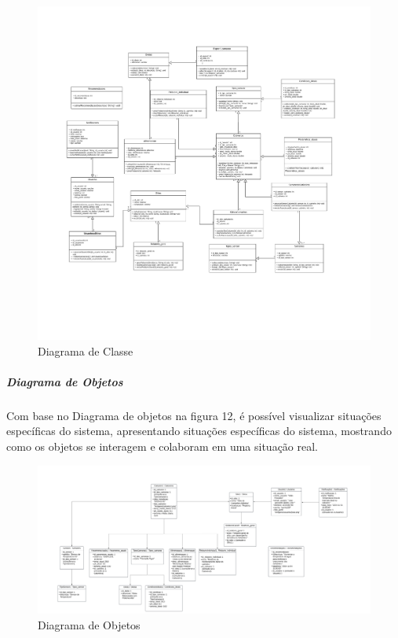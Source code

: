     \begin{figure}[!htb]
        \centering
        \caption{Diagrama de Classe}%
        \label{fig:classe}
        \includegraphics[width = 1.6\CaptionWidth]{Imagem/Diagramas de Classe.jpg}
    \end{figure}

\newpage

\subparagraph*{\textbf{Diagrama de Objetos}}

Com base no Diagrama de objetos na figura 12, é possível visualizar situações específicas do sistema, apresentando situações específicas do sistema, mostrando como os objetos se interagem e colaboram em uma situação real.

\begin{figure}[!htb]
    \centering
    \caption{Diagrama de Objetos}%
    \label{fig:objetos}
    \includegraphics[width = 1.6\CaptionWidth]{Imagem/Diagrama de Objetos.jpg}
\end{figure}

